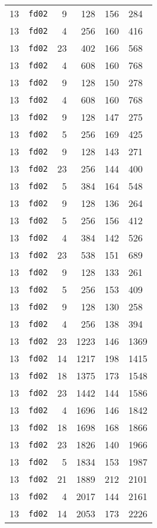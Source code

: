 \documentclass{article}
\begin{document}
\begin{table}[h!]
\begin{tabular}{llrrrl}
    13 & \texttt{fd02} & 9 & 128 & 156 & 284 \\
    13 & \texttt{fd02} & 4 & 256 & 160 & 416 \\
    13 & \texttt{fd02} & 23 & 402 & 166 & 568 \\
    13 & \texttt{fd02} & 4 & 608 & 160 & 768 \\
    13 & \texttt{fd02} & 9 & 128 & 150 & 278 \\
    13 & \texttt{fd02} & 4 & 608 & 160 & 768 \\
    13 & \texttt{fd02} & 9 & 128 & 147 & 275 \\
    13 & \texttt{fd02} & 5 & 256 & 169 & 425 \\
    13 & \texttt{fd02} & 9 & 128 & 143 & 271 \\
    13 & \texttt{fd02} & 23 & 256 & 144 & 400 \\
    13 & \texttt{fd02} & 5 & 384 & 164 & 548 \\
    13 & \texttt{fd02} & 9 & 128 & 136 & 264 \\
    13 & \texttt{fd02} & 5 & 256 & 156 & 412 \\
    13 & \texttt{fd02} & 4 & 384 & 142 & 526 \\
    13 & \texttt{fd02} & 23 & 538 & 151 & 689 \\
    13 & \texttt{fd02} & 9 & 128 & 133 & 261 \\
    13 & \texttt{fd02} & 5 & 256 & 153 & 409 \\
    13 & \texttt{fd02} & 9 & 128 & 130 & 258 \\
    13 & \texttt{fd02} & 4 & 256 & 138 & 394 \\
    13 & \texttt{fd02} & 23 & 1223 & 146 & 1369 \\
    13 & \texttt{fd02} & 14 & 1217 & 198 & 1415 \\
    13 & \texttt{fd02} & 18 & 1375 & 173 & 1548 \\
    13 & \texttt{fd02} & 23 & 1442 & 144 & 1586 \\
    13 & \texttt{fd02} & 4 & 1696 & 146 & 1842 \\
    13 & \texttt{fd02} & 18 & 1698 & 168 & 1866 \\
    13 & \texttt{fd02} & 23 & 1826 & 140 & 1966 \\
    13 & \texttt{fd02} & 5 & 1834 & 153 & 1987 \\
    13 & \texttt{fd02} & 21 & 1889 & 212 & 2101 \\
    13 & \texttt{fd02} & 4 & 2017 & 144 & 2161 \\
    13 & \texttt{fd02} & 14 & 2053 & 173 & 2226 \\

\end{tabular}
\end{table}
\end{document}
